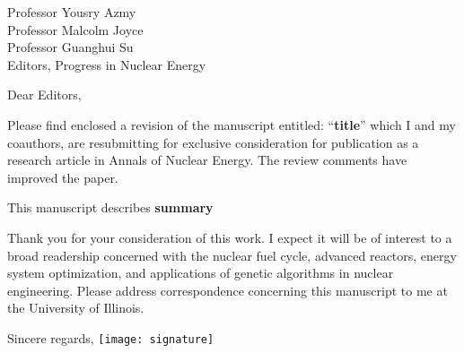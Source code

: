 \documentclass[11pt]{letter} %
\begin{document}


\begin{letter}{Professor Yousry Azmy\\
Professor Malcolm Joyce\\
Professor Guanghui Su\\
Editors, Progress in Nuclear Energy}


\address{Kathryn D. Huff\\
kdhuff@illinois.edu\\
111B Talbot Laboratory\\
104 S. Wright Street\\
Urbana, IL 61801}



\opening{Dear Editors,}

Please find enclosed a revision of the manuscript entitled: ``\textbf{title}'' 
        which I and my coauthors,  are resubmitting for 
        exclusive consideration for publication as a research 
article in Annals of Nuclear Energy. The review comments have improved the 
paper.

        This manuscript describes \textbf{summary}

Thank you for your consideration of this work. I expect it will be of interest
to a broad readership concerned with the nuclear fuel cycle, advanced reactors,
energy system optimization, and applications of genetic algorithms in nuclear 
        engineering.
        Please address correspondence concerning
this manuscript to me at the University of Illinois.

\closing{Sincere regards,
\texttt{[image: signature]}\\
}


\end{letter}
\end{document}
